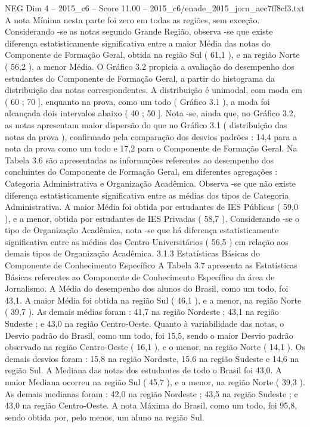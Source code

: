 \begin{textsample}{NEG Dim 4 – 2015\_c6 – Score 11.00 – 2015\_c6/enade\_2015\_jorn\_aec7ff8cf3.txt}
A nota Mínima nesta parte foi zero em todas as regiões, sem exceção.
Considerando -se as notas segundo Grande Região, observa -se que existe diferença estatisticamente significativa entre a maior Média das notas do Componente de Formação Geral, obtida na região Sul ( 61,1 ), e na região Norte ( 56,2 ), a menor Média.
O Gráfico 3.2 propicia a avaliação do desempenho dos estudantes do Componente de Formação Geral, a partir do histograma da distribuição das notas correspondentes.
A distribuição é unimodal, com moda em ( 60 ; 70 ], enquanto na prova, como um todo ( Gráfico 3.1 ), a moda foi alcançada dois intervalos abaixo ( 40 ; 50 ].
Nota -se, ainda que, no Gráfico 3.2, as notas apresentam maior dispersão do que no Gráfico 3.1 ( distribuição das notas da prova ), confirmado pela comparação dos desvios padrões : 14,4 para a nota da prova como um todo e 17,2 para o Componente de Formação Geral.
Na Tabela 3.6 são apresentadas as informações referentes ao desempenho dos concluintes do Componente de Formação Geral, em diferentes agregações : Categoria Administrativa e Organização Acadêmica.
Observa -se que não existe diferença estatisticamente significativa entre as médias dos tipos de Categoria Administrativa.
A maior Média foi obtida por estudantes de IES Públicas ( 59,0 ), e a menor, obtida por estudantes de IES Privadas ( 58,7 ).
Considerando -se o tipo de Organização Acadêmica, nota -se que há diferença estatisticamente significativa entre as médias dos Centro Universitários ( 56,5 ) em relação aos demais tipos de Organização Acadêmica. 3.1.3 Estatísticas Básicas do Componente de Conhecimento Específico A Tabela 3.7 apresenta as Estatísticas Básicas referentes ao Componente de Conhecimento Específico da área de Jornalismo.
A Média do desempenho dos alunos do Brasil, como um todo, foi 43,1.
A maior Média foi obtida na região Sul ( 46,1 ), e a menor, na região Norte ( 39,7 ).
As demais médias foram : 41,7 na região Nordeste ; 43,1 na região Sudeste ; e 43,0 na região Centro-Oeste.
Quanto à variabilidade das notas, o Desvio padrão do Brasil, como um todo, foi 15,5, sendo o maior Desvio padrão observado na região Centro-Oeste ( 16,1 ), e o menor, na região Norte ( 14,1 ).
Os demais desvios foram : 15,8 na região Nordeste, 15,6 na região Sudeste e 14,6 na região Sul.
A Mediana das notas dos estudantes de todo o Brasil foi 43,0.
A maior Mediana ocorreu na região Sul ( 45,7 ), e a menor, na região Norte ( 39,3 ).
As demais medianas foram : 42,0 na região Nordeste ; 43,5 na região Sudeste ; e 43,0 na região Centro-Oeste.
A nota Máxima do Brasil, como um todo, foi 95,8, sendo obtida por, pelo menos, um aluno na região Sul.

\end{textsample}
